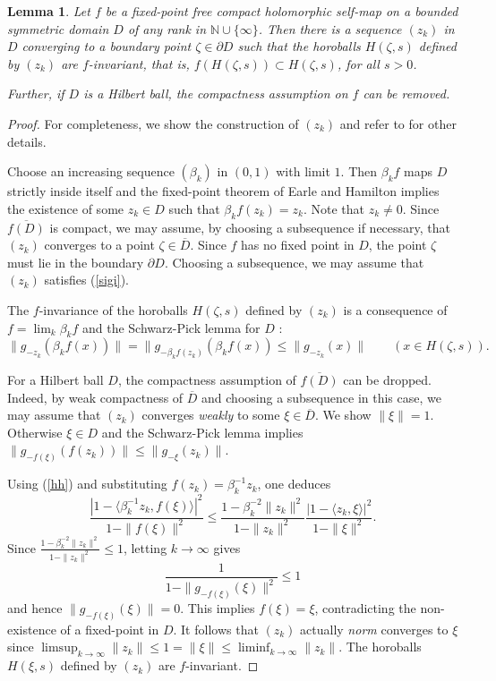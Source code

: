 \documentclass[12pt, twoside]{article}
\newtheorem{lemma}[theorem]{Lemma}
\theoremstyle{definition}
\numberwithin{equation}{section}
\begin{document}
\begin{lemma} \label{g} Let $f$ be a fixed-point free compact holomorphic self-map on a bounded symmetric domain
$D$ of any rank in $\mathbb{N}\cup \{\infty\}$.
Then there is a sequence $(z_k)$ in $D$ converging
to a boundary point $\zeta \in \partial D$ such that the horoballs
$H(\zeta, s)$ defined by $(z_k)$ are $f$-invariant, that is, $f(H(\zeta,s)) \subset H(\zeta,s)$,
 for all $s>0$.

Further, if $D$ is a Hilbert ball, the compactness assumption on $f$ can be removed.
\end{lemma}
\begin{proof} For completeness,
we show the construction of $(z_k)$ and refer to  \cite[Theorem 4.4]{horo}
for other details.

Choose an increasing sequence $(\beta_k)$ in $(0,1)$ with
limit $1$. Then $\beta_k f$ maps $D$ strictly inside itself and
 the fixed-point theorem of Earle and Hamilton \cite{eh} implies the existence of some $z_k \in D$
such that $\beta_kf(z_k) = z_k$. Note that $z_k \neq
0$. Since $\overline{f(D)}$ is compact, we may assume, by choosing
a subsequence if necessary, that $(z_k)$ converges to a point $\zeta
\in \overline D$. Since $f$ has no fixed point in $D$, the point
$\zeta$ must lie in the boundary $\partial D$. Choosing a subsequence, we may assume that
$(z_k)$ satisfies (\ref{sigi}).

The $f$-invariance of  the horoballs $H(\zeta,s)$ defined by $(z_k)$
is a consequence of $f= \lim_k \beta_k f$ and the Schwarz-Pick lemma for $D$ \cite[Lemma 3.5.18]{book2}:
$$ \|g_{-z_k}(\beta_k f(x))\| =\|g_{-\beta_k f (z_k)}(\beta_k f (x)) \leq \|g_{-z_k}(x)\|
\qquad (x\in H(\zeta, s)).$$

For a Hilbert ball $D$, the compactness assumption of $\overline{f(D)}$ can be dropped.
Indeed, by weak compactness of $\overline D$ and choosing a subsequence in this case, we may assume
that $(z_k)$ converges {\it weakly} to some $\xi \in \overline D$. We show $\|\xi\|=1$.
Otherwise $\xi \in D$
and the Schwarz-Pick lemma implies $ \|g_{-f( \xi)}(f( z_k))\| \leq  \|g_{- \xi}( z_k)\|$.

Using (\ref{hh}) and substituting $ f( z_k) =\beta_k^{-1} z_k$, one deduces
$$\frac{|1-\langle \beta_k^{-1} z_k, f( \xi)\rangle|^2}{1-\|f( \xi)\|^2}\leq
\frac{1-\beta_k^{-2}\| z_k\|^2}{1-\| z_k\|^2} \frac{|1-\langle  z_k,
 \xi\rangle|^2}{1-\| \xi\|^2}.$$
Since $\frac{1-\beta_k^{-2}\| z_k\|^2}{1-\| z_k\|^2} \leq 1$, letting $k \rightarrow \infty$ gives
$$\frac{1}{1-\|g_{-f( \xi)}( \xi)\|^2} \leq 1$$
and hence $\|g_{-f( \xi)}( \xi)\|=0$. This implies
 $f( \xi) =  \xi$, contradicting the  non-existence of a fixed-point in $D$. It follows that
  $( z_{k})$ actually {\it norm} converges to $ \xi$
   since $\limsup_{k\rightarrow \infty} \| z_{k}\| \leq 1
  =\| \xi\| \leq \liminf_{k\rightarrow \infty}\| z_{k}\|$.
The horoballs $H(\xi,s)$ defined by $(z_k)$ are $f$-invariant.
\end{proof}
\end{document}
